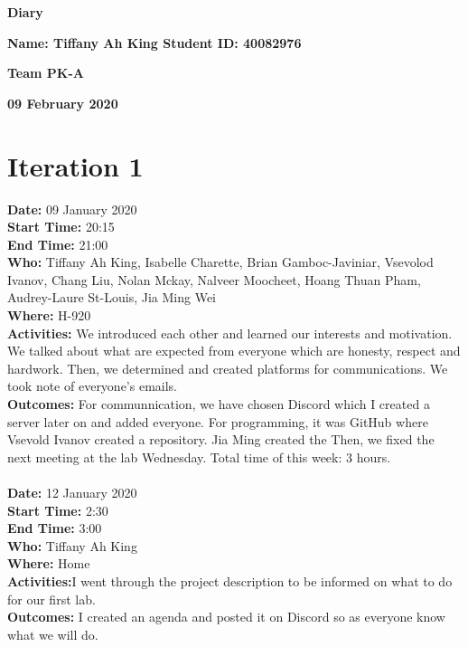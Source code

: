 \documentclass[12pt]{article}
\begin{document}
\vspace*{0.2in}
\centerline{\bf\Large Diary}

\vspace*{0.2in}
\centerline{\bf\Large Name: Tiffany Ah King  Student ID: 40082976}

\vspace*{0.2in}
\centerline{\bf\Large Team PK-A}

\vspace*{0.2in}
\centerline{\bf\Large 09 February 2020}

\section{Iteration 1}

{\bf Date:} 09 January 2020\\
{\bf Start Time:} 20:15\\
{\bf End Time:} 21:00 \\
{\bf Who:} Tiffany Ah King, Isabelle Charette, Brian Gamboc-Javiniar, Vsevolod Ivanov,
Chang Liu, Nolan Mckay, Nalveer Moocheet, Hoang Thuan Pham, Audrey-Laure St-Louis, Jia Ming Wei\\
{\bf Where:} H-920 \\
{\bf Activities:} We introduced each other and learned our interests and motivation. We talked about what are expected from everyone which are honesty, respect and hardwork. Then, we determined and created platforms for communications. We took note of everyone's emails.\\
{\bf Outcomes:} For communnication, we have chosen Discord which I created a server later on and added everyone. For programming, it was GitHub where Vsevold Ivanov created a repository. Jia Ming created the Then, we fixed the next meeting at the lab Wednesday. Total time of this week: 3 hours.\\ \\


{\bf Date:} 12 January 2020\\
{\bf Start Time:} 2:30\\
{\bf End Time:} 3:00  \\
{\bf Who:} Tiffany Ah King\\
{\bf Where:} Home \\
{\bf Activities:}I went through the project description to be informed on what to do for our first lab.\\
{\bf Outcomes:} I created an agenda and posted it on Discord so as everyone know what we will do.\\ \\
\end{document}
